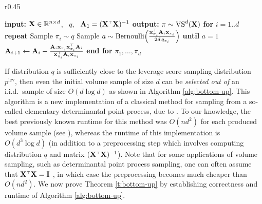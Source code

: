 \documentclass[12pt]{sty/colt2019/colt2018-arxiv}
\begin{document}
\begin{wrapfigure}{r}{0.45\textwidth}
  \vspace{-6mm}
  \centering
\begin{minipage}{0.45\textwidth}
\begin{algorithm}[H] 
    \caption{\small (Bottom-up) volume sampling}\label{alg:bottom-up}
  \begin{algorithmic}[0]
    \STATE \textbf{input:} $\mathbf X\in\mathbb R^{n\times d}$, \ $q$, \ 
    $\A_1=(\X^\top\X)^{-1}$ 
    \STATE \textbf{output:} $\pi\sim{\mathrm{VS}}^d(\mathbf X)$
    \STATE \textbf{for }$i=1..d$
    \STATE \quad\textbf{repeat}
    \STATE  \quad\quad Sample $\pi_i \sim q$
    \STATE \quad\quad Sample $a\sim
    \text{Bernoulli}\Big(\frac{\x_{\pi_i}^\top\A_i\x_{\pi_i}}{2d \,q_{\pi_i}}\Big)$
    \STATE \quad\textbf{until} $a=1$
    \STATE \quad$\A_{i+1} \leftarrow \A_i -
    \frac{\A_i\x_{\pi_i}\x_{\pi_i}^\top\A_i}{\x_{\pi_i}^\top\A_i\x_{\pi_i}}$
    \STATE \textbf{end for}
    \RETURN $\pi_1,\dots,\pi_d$
  \end{algorithmic}
\end{algorithm}
\end{minipage}
\vspace{-4mm}
\end{wrapfigure}
If distribution $q$
is sufficiently close to the leverage score sampling distribution
$p^{\mathrm{lev}}$, then even the initial volume sample of size $d$ can
be \textit{selected out of} an i.i.d.~sample of size $O(d\log d)$ as
shown in Algorithm \ref{alg:bottom-up}. This algorithm is a new
implementation of a classical method for sampling from a so-called
elementary determinantal point process, due to
\cite{dpp-independence}. To our knowledge, the best previously known
runtime for this method was $O(nd^2)$ for each produced volume sample
(see \cite{dpp-coreset}), whereas the runtime of this implementation is
$O(d^3\log d)$ (in addition to a preprocessing step which involves
computing distribution $q$ and matrix $(\X^\top\X)^{-1}$). Note that
for some applications of volume sampling, such as determinantal point
process sampling, one can often assume that $\X^\top\X=\I$ 
\citep[see][]{dpp-intermediate}, in which case the preprocessing becomes much
cheaper than $O(nd^2)$. We now prove Theorem
\ref{t:bottom-up} by establishing correctness and runtime of Algorithm
\ref{alg:bottom-up}.
\end{document}

